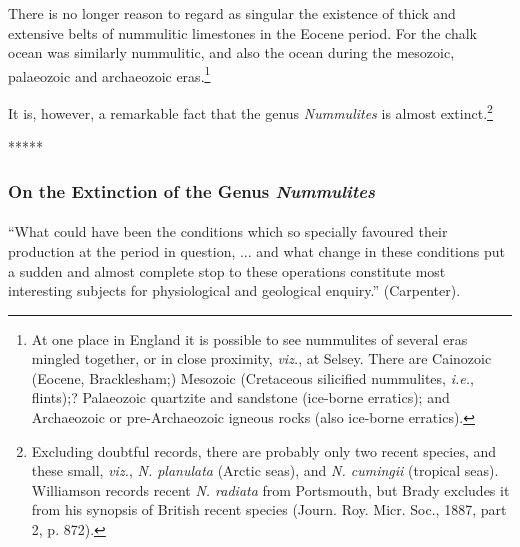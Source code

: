 \documentclass[a4paper, 12pt, oneside, landscape]{article}
\begin{document}
There is no longer reason to regard as singular the existence of thick and extensive belts of nummulitic limestones in the Eocene period. For the chalk ocean was similarly nummulitic, and also the ocean during the mesozoic, palaeozoic and archaeozoic eras.\footnote{At one place in England it is possible to see nummulites of several eras mingled together, or in close proximity, \emph{viz.}, at Selsey. There are Cainozoic (Eocene, Bracklesham;) Mesozoic (Cretaceous silicified nummulites, \emph{i.e.}, flints);? Palaeozoic quartzite and sandstone (ice-borne erratics); and Archaeozoic or pre-Archaeozoic igneous rocks (also ice-borne erratics).}

It is, however, a remarkable fact that the genus \emph{Nummulites} is almost extinct.\footnote{Excluding doubtful records, there are probably only two recent species, and these small, \emph{viz.}, \emph{N. planulata} (Arctic seas), and \emph{N. cumingii} (tropical seas). Williamson records recent \emph{N. radiata} from Portsmouth, but Brady excludes it from his synopsis of British recent species (Journ. Roy. Micr. Soc., 1887, part 2, p. 872).}

\centerline{*\hspace{15mm}*\hspace{15mm}*\hspace{15mm}*\hspace{15mm}*}
\bigskip

\subsubsection{On the Extinction of the Genus \emph{Nummulites}}
\paragraph{}
``What could have been the conditions which so specially favoured their production at the period in question, ... and what change in these conditions put a sudden and almost complete stop to these operations constitute most interesting subjects for physiological and geological enquiry.'' (Carpenter).
\end{document}
